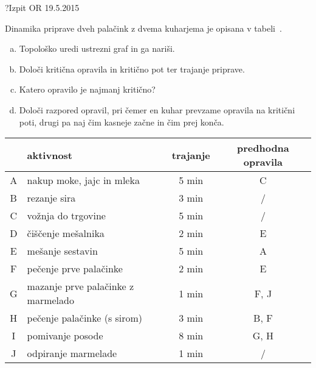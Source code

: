 \begin{naloga}{?}{Izpit OR 19.5.2015}
\begin{vprasanje}[palacinke]
Dinamika priprave dveh palačink z dvema kuharjema
je opisana v tabeli~\tab{}.
\begin{enumerate}[(a)]
\item Topološko uredi ustrezni graf in ga nariši.
\item Določi kritična opravila in kritično pot ter trajanje priprave.
\item Katero opravilo je najmanj kritično?
\item Določi razpored opravil,
pri čemer en kuhar prevzame opravila na kritični poti,
drugi pa naj čim kasneje začne in čim prej konča.
\end{enumerate}

\begin{tabela}
\begin{tabular}{c|l|c|c}
& aktivnost & trajanje & predhodna opravila \\
\hline
A & nakup moke, jajc in mleka & 5 min & C \\
B & rezanje sira & 3 min & / \\
C & vožnja do trgovine & 5 min & / \\
D & čiščenje mešalnika & 2 min & E \\
E & mešanje sestavin & 5 min & A \\
F & pečenje prve palačinke & 2 min & E \\
G & mazanje prve palačinke z marmelado & 1 min & F, J \\
H & pečenje palačinke (s sirom) & 3 min & B, F \\
I & pomivanje posode & 8 min & G, H \\
J & odpiranje marmelade & 1 min & / \\
\end{tabular}
\end{tabela}
\end{vprasanje}
\begin{odgovor}
\end{odgovor}
\end{naloga}


